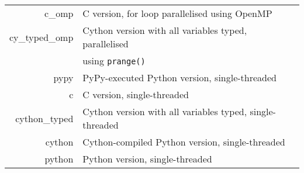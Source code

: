 \begin{tabular}{rl}
	c\_omp         & C version, for loop parallelised using OpenMP \\
	cy\_typed\_omp & Cython version with all variables typed, parallelised \\
	               & using \verb|prange()| \\
	pypy           & PyPy-executed Python version, single-threaded \\
	c              & C version, single-threaded \\
	cython\_typed  & Cython version with all variables typed, single-threaded \\
	cython         & Cython-compiled Python version, single-threaded \\
	python         & Python version, single-threaded \\
\end{tabular}

